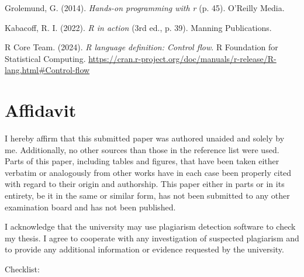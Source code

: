 \documentclass[
  man,
  floatsintext,
  longtable,
  nolmodern,
  notxfonts,
  notimes,
  colorlinks=true,linkcolor=blue,citecolor=blue,urlcolor=blue]{apa7}
\newlength{\cslhangindent}
\newenvironment{CSLReferences}[2] %
 {\begin{list}{}{%
  \setlength{\itemindent}{0pt}
  \setlength{\leftmargin}{0pt}
  \setlength{\parsep}{0pt}
  \ifodd #1
   \setlength{\leftmargin}{\cslhangindent}
   \setlength{\itemindent}{-1\cslhangindent}
  \fi
  \setlength{\itemsep}{#2\baselineskip}}}
 {\end{list}}
\begin{document}
\label{refs}
\begin{CSLReferences}{1}{0}
Grolemund, G. (2014). \emph{Hands-on programming with r} (p. 45).
O'Reilly Media.

Kabacoff, R. I. (2022). \emph{R in action} (3rd ed., p. 39). Manning
Publications.

R Core Team. (2024). \emph{R language definition: Control flow}. R
Foundation for Statistical Computing.
\url{https://cran.r-project.org/doc/manuals/r-release/R-lang.html\#Control-flow}

\end{CSLReferences}

\section{Affidavit}\label{affidavit}

I hereby affirm that this submitted paper was authored unaided and
solely by me. Additionally, no other sources than those in the reference
list were used. Parts of this paper, including tables and figures, that
have been taken either verbatim or analogously from other works have in
each case been properly cited with regard to their origin and
authorship. This paper either in parts or in its entirety, be it in the
same or similar form, has not been submitted to any other examination
board and has not been published.

I acknowledge that the university may use plagiarism detection software
to check my thesis. I agree to cooperate with any investigation of
suspected plagiarism and to provide any additional information or
evidence requested by the university.

Checklist:
\end{document}
